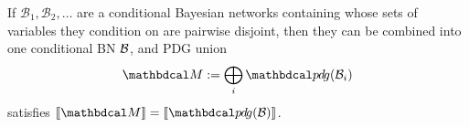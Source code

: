 \documentclass{article}
\begin{document}
	\begin{inactive}
	    \begin{prop}
	    If $\mathcal B_1, \mathcal B_2, \ldots$ are a conditional Bayesian
	    networks containing whose sets of variables they condition on are
	    pairwise disjoint, then they can be combined into one conditional BN
	    $\cal B$, and  PDG union 
	 	\[ {\dg M} := \bigoplus_i \PDGof{\mathcal B_i} \]  
				satisfies
				$\bbr{\dg M} = \bbr{\PDGof{\cal B}}$.
		\end{prop}
	\end{inactive}
	
\end{document}
